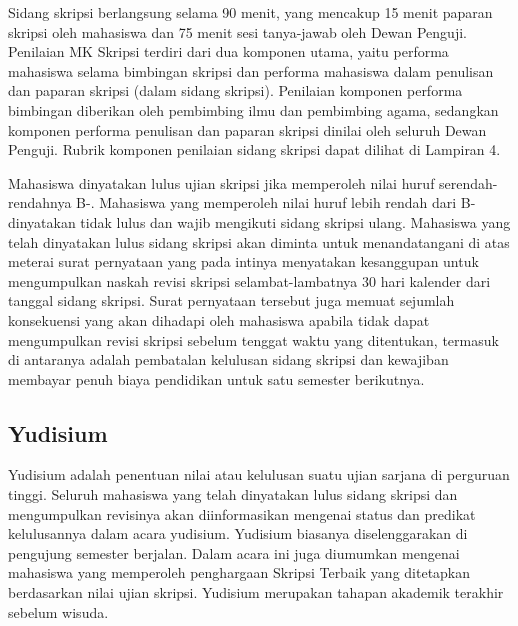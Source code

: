 \documentclass[
  indonesian,
  letterpaper,
]{scrbook}
\begin{document}
Sidang skripsi berlangsung selama 90 menit, yang mencakup 15 menit
paparan skripsi oleh mahasiswa dan 75 menit sesi tanya-jawab oleh Dewan
Penguji. Penilaian MK Skripsi terdiri dari dua komponen utama, yaitu
performa mahasiswa selama bimbingan skripsi dan performa mahasiswa dalam
penulisan dan paparan skripsi (dalam sidang skripsi). Penilaian komponen
performa bimbingan diberikan oleh pembimbing ilmu dan pembimbing agama,
sedangkan komponen performa penulisan dan paparan skripsi dinilai oleh
seluruh Dewan Penguji. Rubrik komponen penilaian sidang skripsi dapat
dilihat di Lampiran 4.

Mahasiswa dinyatakan lulus ujian skripsi jika memperoleh nilai huruf
serendah-rendahnya B-. Mahasiswa yang memperoleh nilai huruf lebih
rendah dari B- dinyatakan tidak lulus dan wajib mengikuti sidang skripsi
ulang. Mahasiswa yang telah dinyatakan lulus sidang skripsi akan diminta
untuk menandatangani di atas meterai surat pernyataan yang pada intinya
menyatakan kesanggupan untuk mengumpulkan naskah revisi skripsi
selambat-lambatnya 30 hari kalender dari tanggal sidang skripsi. Surat
pernyataan tersebut juga memuat sejumlah konsekuensi yang akan dihadapi
oleh mahasiswa apabila tidak dapat mengumpulkan revisi skripsi sebelum
tenggat waktu yang ditentukan, termasuk di antaranya adalah pembatalan
kelulusan sidang skripsi dan kewajiban membayar penuh biaya pendidikan
untuk satu semester berikutnya.

\subsection*{Yudisium}\label{yudisium}

Yudisium adalah penentuan nilai atau kelulusan suatu ujian sarjana di
perguruan tinggi. Seluruh mahasiswa yang telah dinyatakan lulus sidang
skripsi dan mengumpulkan revisinya akan diinformasikan mengenai status
dan predikat kelulusannya dalam acara yudisium. Yudisium biasanya
diselenggarakan di pengujung semester berjalan. Dalam acara ini juga
diumumkan mengenai mahasiswa yang memperoleh penghargaan Skripsi Terbaik
yang ditetapkan berdasarkan nilai ujian skripsi. Yudisium merupakan
tahapan akademik terakhir sebelum wisuda.
\end{document}
